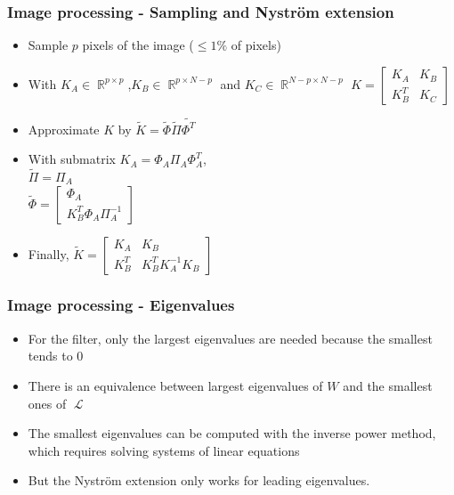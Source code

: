 \documentclass{beamer}
\DeclareMathOperator{\Lapl}{\mathcal{L}}
\DeclareMathOperator{\Real}{\mathbb{R}}
\begin{document}
\begin{frame}
 \frametitle{Image processing - Sampling and Nystr\"om extension}
 \begin{itemize}
  \item Sample \(p\) pixels of the image (\(\le 1\%\) of pixels)
  \item With \(K_A \in \Real^{p \times p}\),\(K_B \in \Real^{p \times N-p}\) and \(K_C \in \Real^{N-p \times N-p}\) \(K = \begin{bmatrix}K_A & K_B \\ K_B^T & K_C\end{bmatrix}\)
  \item Approximate \(K\) by \(\tilde{K} = \tilde{\Phi} \tilde{\Pi} \tilde{\Phi^T}\)
  \item With submatrix \(K_A = \Phi_A \Pi_A \Phi_A^T\), \\
   \(\tilde{\Pi} = \Pi_A\) \\
   \(\tilde{\Phi} = \begin{bmatrix}\Phi_A \\ K_B^T \Phi_A \Pi_A^{-1} \end{bmatrix}\)
  \item Finally, \(\tilde{K} = \begin{bmatrix} K_A & K_B \\ K_B^T & K_B^T K_A^{-1} K_B \end{bmatrix}\)
 \end{itemize}
\end{frame}

\begin{frame}
 \frametitle{Image processing - Eigenvalues}
 \begin{itemize}
  \item For the filter, only the largest eigenvalues are needed because the smallest tends to 0
  \item There is an equivalence between largest eigenvalues of \(W\) and the smallest ones of \(\Lapl\)
  \item The smallest eigenvalues can be computed with the inverse power method, which requires solving systems of linear equations
  \item But the Nystr\"om extension only works for leading eigenvalues.
 \end{itemize}
\end{frame}
\end{document}
